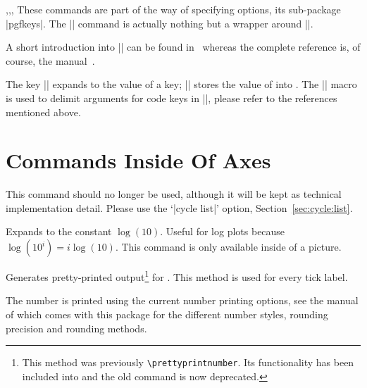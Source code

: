 \begin{commandlist}{\pgfkeys,\pgfeov,\pgfkeysvalueof,\pgfkeysgetvalue}
    These commands are part of the \Tikz{} way of specifying options, its
    sub-package |pgfkeys|. The |\pgfplotsset| command is actually nothing but a
    wrapper around |\pgfkeys|.

    A short introduction into |\pgfkeys| can be found in~\cite{keyvalintro}
    whereas the complete reference is, of course, the \Tikz{}
    manual~\cite{tikz}.

    The key |\pgfkeysvalueof| expands to the value of a key;
    |\pgfkeysgetvalue| stores the
    value of  into . The |\pgfeov|
    macro is used to delimit arguments for code keys in |\pgfkeys|, please
    refer to the references mentioned above.
\end{commandlist}


\section[Commands Inside Of PGFPlots Axes]
        {Commands Inside Of {\normalfont\PGFPlots{}} Axes}

\begin{command}{\autoplotspeclist}
    This command should no longer be used, although it will be kept as
    technical implementation detail. Please use the `|cycle list|' option,
    Section~\ref{sec:cycle:list}.
\end{command}

\begin{command}{\logten}
    Expands to the constant $\log(10)$. Useful for log plots because $\log(10^i)
    = i\log(10)$. This command is only available inside of a \Tikz{} picture.
\end{command}

\begin{command}{\pgfmathprintnumber{}}
    Generates pretty-printed output\footnote{This method was previously
    \texttt{\textbackslash prettyprintnumber}. Its functionality has been
    included into \PGF{} and the old command is now deprecated.} for
    . This method is used for every tick label.

    The number is printed using the current number printing options, see the
    manual of \PGFPlotstable{} which comes with this package for the different
    number styles, rounding precision and rounding methods.
\end{command}

